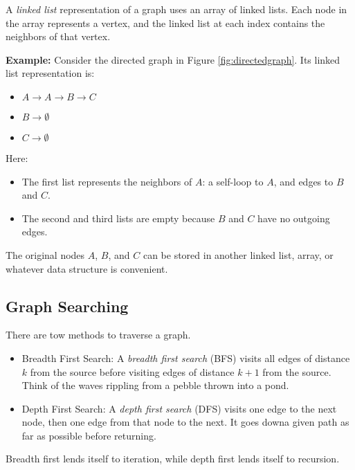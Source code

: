 A \emph{linked list} representation of a graph uses an array of linked lists. Each node in the array represents a vertex, and the linked list at each index contains the neighbors of that vertex.

\textbf{Example:} Consider the directed graph in Figure \ref{fig:directedgraph}. Its linked list representation is:

\begin{itemize}
    \item $A \to A \to B \to C$
    \item $B \to \emptyset$
    \item $C \to \emptyset$
\end{itemize}

Here:
\begin{itemize}
    \item The first list represents the neighbors of $A$:
          a self-loop to $A$, and edges to $B$ and $C$.
    \item The second and third lists are empty because $B$ and
          $C$ have no outgoing edges.
\end{itemize}

The original nodes $A$, $B$, and $C$ can be stored in another
linked list, array, or whatever data structure is convenient.

\subsection{Graph Searching}

There are tow methods to traverse a graph.

\begin{itemize}
    \item Breadth First Search:
          A \emph{breadth first search} (BFS) visits all edges of distance $k$ from
          the source before visiting edges of distance $k+1$ from the source.
          Think of the waves rippling from a pebble thrown into a pond.
    \item Depth First Search:
          A \emph{depth first search} (DFS) visits one edge to the next node, then one edge from
          that node to the next. It goes downa  given path as far as possible
          before returning.
\end{itemize}

Breadth first lends itself to iteration, while depth first lends itself
to recursion.